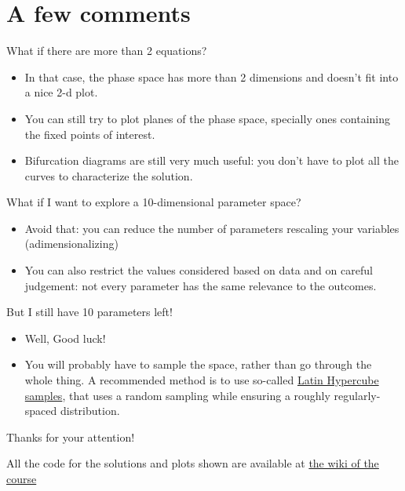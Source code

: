 \documentclass{beamer}
\begin{document}
\section{A few comments}

\begin{frame}{What if there are more than 2 equations?}
    \begin{itemize}
        \item In that case, the phase space has more than 2 dimensions and
            doesn't fit into a nice 2-d plot.
        \item You can still try to plot planes of the phase space, specially
            ones containing the fixed points of interest.
        \item Bifurcation diagrams are still very much useful: you don't have
            to plot all the curves to characterize the solution.
    \end{itemize}
\end{frame}

\begin{frame}{What if I want to explore a 10-dimensional parameter
    space?}
    \begin{itemize}
        \item Avoid that: you can reduce the number of parameters
            rescaling your variables (adimensionalizing)
        \item You can also restrict the values considered based on data and on
            careful judgement: not every parameter has the same relevance to
            the outcomes.
    \end{itemize}
    \pause

    But I still have 10 parameters left!

    \begin{itemize}
        \item Well, Good luck!
        \item You will probably have to sample the space, rather than
            go through the whole thing. A recommended method is to use
            so-called
            \href{http://en.wikipedia.org/wiki/Latin_hypercube_sampling}{Latin Hypercube
            samples},
            that uses a random sampling while ensuring a roughly
            regularly-spaced distribution.
    \end{itemize}
\end{frame}

\begin{frame}{}
    Thanks for your attention!

    \vspace{4ex}
    All the code for the solutions and plots shown are available at 
    \href{http://ecologia.ib.usp.br/ssmb/doku.php?id=2014:courses:kraenkel:start}{the
    wiki of the course}
\end{frame}
\end{document}
